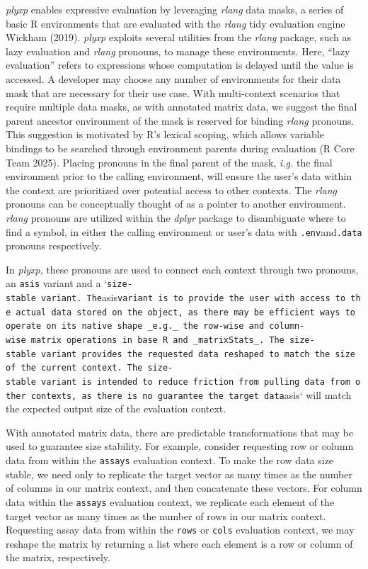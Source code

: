 \documentclass[
  letterpaper,
  DIV=11,
  numbers=noendperiod]{scrartcl}
\begin{document}
\emph{plyxp} enables expressive evaluation by leveraging \emph{rlang}
data masks, a series of basic R environments that are evaluated with the
\emph{rlang} tidy evaluation engine Wickham (2019). \emph{plyxp}
exploits several utilities from the \emph{rlang} package, such as lazy
evaluation and \emph{rlang} pronouns, to manage these environments.
Here, ``lazy evaluation'' refers to expressions whose computation is
delayed until the value is accessed. A developer may choose any number
of environments for their data mask that are necessary for their use
case. With multi-context scenarios that require multiple data masks, as
with annotated matrix data, we suggest the final parent ancestor
environment of the mask is reserved for binding \emph{rlang} pronouns.
This suggestion is motivated by R's lexical scoping, which allows
variable bindings to be searched through environment parents during
evaluation (R Core Team 2025). Placing pronouns in the final parent of
the mask, \emph{i.g.} the final environment prior to the calling
environment, will ensure the user's data within the context are
prioritized over potential access to other contexts. The \emph{rlang}
pronouns can be conceptually thought of as a pointer to another
environment. \emph{rlang} pronouns are utilized within the \emph{dplyr}
package to disambiguate where to find a symbol, in either the calling
environment or user's data with \texttt{.env}and\texttt{.data} pronouns
respectively.

In \emph{plyxp}, these pronouns are used to connect each context through
two pronouns, an \texttt{asis} variant and a
`\texttt{size-stable\textquotesingle{}\textquotesingle{}\ variant.\ The}asis\texttt{variant\ is\ to\ provide\ the\ user\ with\ access\ to\ the\ actual\ data\ stored\ on\ the\ object,\ as\ there\ may\ be\ efficient\ ways\ to\ operate\ on\ its\ native\ shape\ \_e.g.\_\ the\ row-wise\ and\ column-wise\ matrix\ operations\ in\ base\ R\ and\ \_matrixStats\_.\ The\ size-stable\ variant\ provides\ the\ requested\ data\ reshaped\ to\ match\ the\ size\ of\ the\ current\ context.\ The\ size-stable\ variant\ is\ intended\ to\ reduce\ friction\ from\ pulling\ data\ from\ other\ contexts,\ as\ there\ is\ no\ guarantee\ the\ target\ data}asis`
will match the expected output size of the evaluation context.

With annotated matrix data, there are predictable transformations that
may be used to guarantee size stability. For example, consider
requesting row or column data from within the \texttt{assays} evaluation
context. To make the row data size stable, we need only to replicate the
target vector as many times as the number of columns in our matrix
context, and then concatenate these vectors. For column data within the
\texttt{assays} evaluation context, we replicate each element of the
target vector as many times as the number of rows in our matrix context.
Requesting assay data from within the \texttt{rows} or \texttt{cols}
evaluation context, we may reshape the matrix by returning a list where
each element is a row or column of the matrix, respectively.
\end{document}
